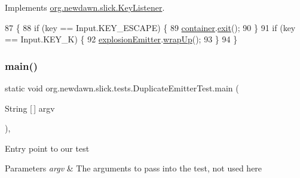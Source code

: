 Implements \mbox{\hyperlink{interfaceorg_1_1newdawn_1_1slick_1_1_key_listener_ac0b0568a21ef486c4f51382614c196ef}{org.\+newdawn.\+slick.\+Key\+Listener}}.


\begin{DoxyCode}
87                                             \{
88         \textcolor{keywordflow}{if} (key == Input.KEY\_ESCAPE) \{
89             \mbox{\hyperlink{classorg_1_1newdawn_1_1slick_1_1tests_1_1_duplicate_emitter_test_a1bd68c36e7b1214aa3633db618e0a7c5}{container}}.\mbox{\hyperlink{classorg_1_1newdawn_1_1slick_1_1_game_container_a6d888463695fe3aac4123e72ac14480f}{exit}}();
90         \}
91         \textcolor{keywordflow}{if} (key == Input.KEY\_K) \{
92             \mbox{\hyperlink{classorg_1_1newdawn_1_1slick_1_1tests_1_1_duplicate_emitter_test_a4dda8eb74bc929d5165d1463b5efc302}{explosionEmitter}}.\mbox{\hyperlink{classorg_1_1newdawn_1_1slick_1_1particles_1_1_configurable_emitter_abb6e55130a2cc7d21ae307aa72fdf45d}{wrapUp}}();
93         \}
94     \}
\end{DoxyCode}
\mbox{\label{classorg_1_1newdawn_1_1slick_1_1tests_1_1_duplicate_emitter_test_a9b0522fd9e9367183c7fae456797525d}} 
\subsubsection{\texorpdfstring{main()}{main()}}
{\footnotesize\ttfamily static void org.\+newdawn.\+slick.\+tests.\+Duplicate\+Emitter\+Test.\+main (\begin{DoxyParamCaption}\item[{String \mbox{[}$\,$\mbox{]}}]{argv }\end{DoxyParamCaption})\hspace{0.3cm}{\ttfamily [inline]}, {\ttfamily [static]}}

Entry point to our test


\begin{DoxyParams}{Parameters}
{\em argv} & The arguments to pass into the test, not used here \\
\hline
\end{DoxyParams}


